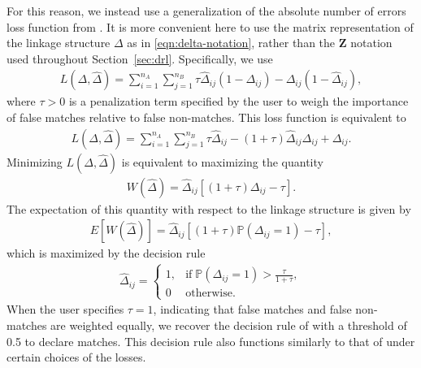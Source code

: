 \documentclass[12pt,letterpaper]{article}
\newcommand{\1}[1]{\mathbb{I}\!\left[#1\right]} %
\begin{document}
For this reason, we instead use a generalization of the absolute number of errors loss function from \cite{Tancredi_2011}. It is more convenient here to use the matrix representation of the linkage structure $\Delta$ as in \eqref{eqn:delta-notation}, rather than the $\bm{Z}$ notation used throughout Section~\ref{sec:drl}. Specifically, we use 
\begin{align*}%
	L(\Delta, \hat{\Delta}) = \sum_{i = 1}^{n_A}\sum_{j = 1}^{n_B}\tau \hat{\Delta}_{ij}(1 - \Delta_{ij}) - \Delta_{ij}(1 - \hat{\Delta}_{ij}),
\end{align*}
where $\tau > 0 $ is a penalization term specified by the user to weigh the importance of false matches relative to false non-matches. This loss function is equivalent to 
\begin{align*}
	L(\Delta, \hat{\Delta}) = \sum_{i = 1}^{n_A}\sum_{j = 1}^{n_B}\tau \hat{\Delta}_{ij} - (1 + \tau)\hat{\Delta}_{ij}\Delta_{ij} + \Delta_{ij}.
\end{align*}
Minimizing $L(\Delta, \hat{\Delta})$ is equivalent to maximizing the quantity
\begin{align*}
	W(\hat{\Delta}) = \hat{\Delta}_{ij}[(1 + \tau) \Delta_{ij} - \tau].
\end{align*}
The expectation of this quantity with respect to the linkage structure is given by 
\begin{align*}
	E[W(\hat{\Delta})] =\hat{\Delta}_{ij}[(1 + \tau) \mathbb{P}(\Delta_{ij} = 1) - \tau],
\end{align*}
which is maximized by the decision rule
\begin{align}\label{eqn:decision-rule}
	\hat{\Delta}_{ij} = \begin{cases}
		1,  &  \text{if}  \; \mathbb{P}(\Delta_{ij} = 1) > \frac{\tau}{1 + \tau},\\
		0 &   \text{otherwise}.
	\end{cases}
\end{align}
When the user specifies $\tau = 1$, indicating that false matches and false non-matches are weighted equally, we recover the decision rule of \cite{Tancredi_2011} with a threshold of 0.5 to declare matches. This decision rule also functions similarly to that of \cite{sadinle_bayesian_2017} under certain choices of the losses. 
\end{document}
